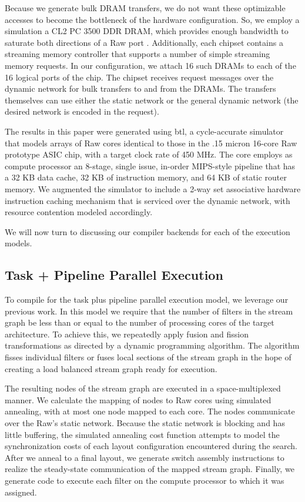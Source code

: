 Because we generate bulk DRAM transfers, we do not want these
optimizable accesses to become the bottleneck of the hardware
configuration.  So, we employ a simulation a CL2 PC 3500 DDR DRAM,
which provides enough bandwidth to saturate both directions of a Raw
port \cite{raw_isca}.  Additionally, each chipset contains a streaming
memory controller that supports a number of simple streaming memory
requests. In our configuration, we attach 16 such DRAMs to each of the
16 logical ports of the chip.  The chipset receives request messages
over the dynamic network for bulk transfers to and from the DRAMs.
The transfers themselves can use either the static network or the
general dynamic network (the desired network is encoded in the
request).

The results in this paper were generated using btl, a cycle-accurate
simulator that models arrays of Raw cores identical to those in the
.15 micron 16-core Raw prototype ASIC chip, with a target clock rate
of 450 MHz. The core employs as compute processor an 8-stage, single
issue, in-order MIPS-style pipeline that has a 32 KB data cache, 32 KB
of instruction memory, and 64 KB of static router memory.  We
augmented the simulator to include a 2-way set associative hardware
instruction caching mechanism that is serviced over the dynamic
network, with resource contention modeled accordingly. 

We will now turn to discussing our compiler backends for each of the
execution models.

\subsection{Task + Pipeline Parallel Execution}
To compile for the task plus pipeline parallel execution model, we
leverage our previous work\cite{streamit-asplos}. In this
model we require that the number of filters in the stream graph be
less than or equal to the number of processing cores of the
target architecture.  To achieve this, we repeatedly apply fusion and
fission transformations as directed by a dynamic programming
algorithm.  The algorithm fisses individual filters or fuses local
sections of the stream graph in the hope of creating a load balanced
stream graph ready for execution. 

The resulting nodes of the stream graph are executed in a
space-multiplexed manner.  We calculate the mapping of nodes to Raw
cores using simulated annealing, with at most one node mapped to each
core.  The nodes communicate over the Raw's static network.  Because
the static network is blocking and has little buffering, the simulated
annealing cost function attempts to model the synchronization costs of
each layout configuration encountered during the search.  After we
anneal to a final layout, we generate switch assembly instructions to
realize the steady-state communication of the mapped stream graph.
Finally, we generate code to execute each filter on the compute
processor to which it was assigned.

